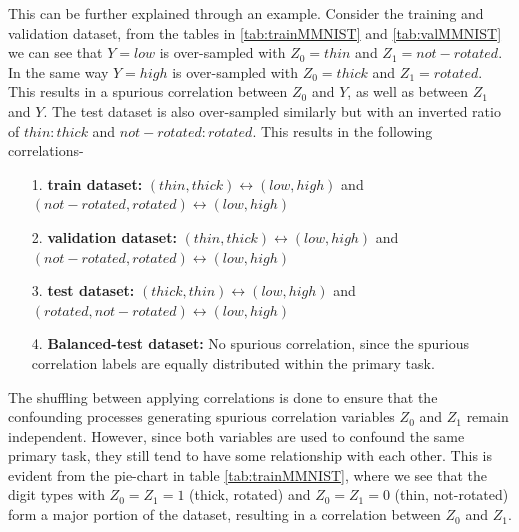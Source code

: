 \documentclass[12pt,DIV14,BCOR12mm,a4paper,footinclude=false,headinclude,parskip=half-,twoside,openright,cleardoublepage=empty,toc=index,bibliography=totoc,listof=totoc]{scrreprt}
\numberwithin{equation}{chapter}
\begin{document}
This can be further explained through an example. Consider the training and validation dataset, from the tables in \ref{tab:trainMMNIST} and \ref{tab:valMMNIST} we can see that $Y=low$ is over-sampled with $Z_0 = thin$ and $Z_1 = not-rotated$. In the same way $Y=high$ is over-sampled with $Z_0 = thick$ and $Z_1 = rotated$. This results in a spurious correlation between $Z_0$ and $Y$, as well as between $Z_1$ and $Y$. The test dataset is also over-sampled similarly but with an inverted ratio of $thin:thick$ and  $not-rotated:rotated$. This results in the following correlations- 
    
\begin{itemize}
  \item[1.] \textbf{train dataset:} $(thin,thick) \leftrightarrow (low,high)$ and $(not-rotated, rotated) \leftrightarrow (low, high)$

  \item[2.] \textbf{validation dataset:} $(thin,thick) \leftrightarrow (low,high)$ and $(not-rotated, rotated) \leftrightarrow (low, high)$
  
  \item[3.] \textbf{test dataset:} $(thick,thin) \leftrightarrow (low,high)$ and $(rotated, not-rotated) \leftrightarrow (low, high)$

  \item[4.] \textbf{Balanced-test dataset:} No spurious correlation, since the spurious correlation labels are equally distributed within the primary task. 
\end{itemize}


The shuffling between applying correlations is done to ensure that the confounding processes generating spurious correlation variables $Z_0$ and $Z_1$ remain independent. However, since both variables are used to confound the same primary task, they still tend to have some relationship with each other. This is evident from the pie-chart in table \ref{tab:trainMMNIST}, where we see that the digit types with $Z_0=Z_1=1$ (thick, rotated) and $Z_0=Z_1=0$ (thin, not-rotated) form a major portion of the dataset, resulting in a correlation between $Z_0$ and $Z_1$.
\end{document}
